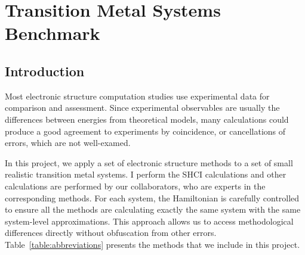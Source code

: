 \chapter{Transition Metal Systems Benchmark}
\label{ch:benchmark}
\section{Introduction}
Most electronic structure computation studies use experimental data for comparison and assessment.
Since experimental observables are usually the differences between energies from theoretical models, many calculations could produce a good agreement to experiments by coincidence, or cancellations of errors, which are not well-examed.

In this project, we apply a set of electronic structure methods to a set of small realistic transition metal systems.
I perform the SHCI calculations and other calculations are performed by our collaborators, who are experts in the corresponding methods.
For each system, the Hamiltonian is carefully controlled to ensure all the methods are calculating exactly the same system with the same system-level approximations.
This approach allows us to access methodological differences directly without obfuscation from other errors.
Table~\ref{table:abbreviations} presents the methods that we include in this project.


